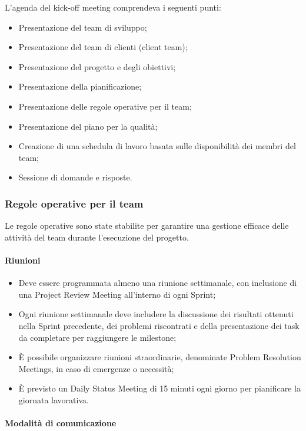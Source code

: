L'agenda del kick-off meeting comprendeva i seguenti punti:

\begin{itemize}
    \item Presentazione del team di sviluppo;
    \item Presentazione del team di clienti (client team);
    \item Presentazione del progetto e degli obiettivi;
    \item Presentazione della pianificazione;
    \item Presentazione delle regole operative per il team;
    \item Presentazione del piano per la qualità;
    \item Creazione di una schedula di lavoro basata sulle disponibilità dei membri del team;
    \item Sessione di domande e risposte.
\end{itemize}

\subsubsection{Regole operative per il team}

Le regole operative sono state stabilite per garantire una gestione efficace delle attività del team durante l'esecuzione del progetto.

\paragraph{Riunioni}

\begin{itemize}
    \item Deve essere programmata almeno una riunione settimanale, con inclusione di una Project Review Meeting all'interno di ogni Sprint;
    \item Ogni riunione settimanale deve includere la discussione dei risultati ottenuti nella Sprint precedente, dei problemi riscontrati e della presentazione dei task da completare per raggiungere le milestone;
    \item È possibile organizzare riunioni straordinarie, denominate Problem Resolution Meetings, in caso di emergenze o necessità;
    \item È previsto un Daily Status Meeting di 15 minuti ogni giorno per pianificare la giornata lavorativa.
\end{itemize}

\paragraph{Modalità di comunicazione}

